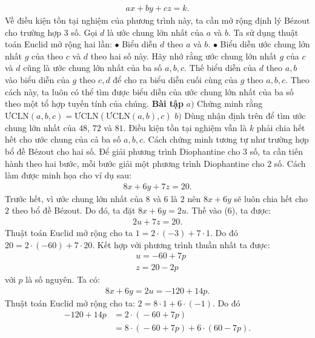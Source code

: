 \begin{multicols}{2}
	\begin{align*}
		ax+by+cz=k.
	\end{align*}
	Về điều kiện tồn tại nghiệm của phương trình này, ta cần mở rộng định lý Bézout cho trường hợp $3$ số.
	\vskip 0.1cm
	Gọi $d$ là ước chung lớn nhất của $a$ và $b$. Ta sử dụng thuật toán Euclid mở rộng hai lần: 
	\vskip 0.1cm
	$\bullet$ Biểu diễn $d$ theo $a$ và $b$.
	\vskip 0.1cm 
	$\bullet$ Biểu diễn ước chung lớn nhất $g$ của theo $c$ và $d$ theo hai số này. Hãy nhớ rằng ước chung lớn nhất $g$ của $c$ và $d$ cũng là ước chung lớn nhất của ba số $a,b,c$.
	\vskip 0.1cm
	Thế biểu diễn của $d$ theo $a,b$ vào biểu diễn của $g$ theo $c,d$ để cho ra biểu diễn cuối cùng của $g$ theo $a,b,c$.
	\vskip 0.1cm 
	Theo cách này, ta luôn có thể tìm được biểu diễn của ước chung lớn nhất của ba số theo một tổ hợp tuyến tính của chúng.
	\vskip 0.1cm
	\textbf{\color{hoccungpi}Bài tập}
	\vskip 0.1cm
	$a)$ Chứng minh rằng $\text{ƯCLN}(a,b,c) = \text{ƯCLN}(\text{ƯCLN}(a,b), c)$
	\vskip 0.1cm
	$b)$ Dùng nhận định trên để tìm ước chung lớn nhất của $48$, $72$ và $81$.
	\vskip 0.1cm
	Điều kiện tồn tại nghiệm vẫn là $k$ phải chia hết hết cho ước chung của cả ba số $a,b,c$. Cách chứng minh tương tự như trường hợp bổ đề Bézout cho hai số.
	\vskip 0.1cm
	Để giải phương trình Diophantine cho $3$ số, ta cần tiến hành theo hai bước, mỗi bước giải một phương trình Diophantine cho $2$ số. Cách làm được minh họa cho ví dụ sau:
	\begin{align*}
		8x+6y+7z=20. \tag{$6$}
	\end{align*}
	Trước hết, vì ước chung lớn nhất của $8$ và $6$ là $2$ nên $8x+6y$ sẽ luôn chia hết cho $2$ theo bổ đề Bézout. Do đó, ta đặt $8x+6y=2u$. Thế vào ($6$), ta được:
	\begin{align*}
		2u+7z=20.
	\end{align*}
	Thuật toán Euclid mở rộng cho ta $1=2\cdot (-3)+7\cdot 1$. Do đó $20=2\cdot (-60)+7\cdot 20$. Kết hợp với phương trình thuần nhất ta được:
	\begin{align*}
		&u=-60+7p\\
		&z=20-2p
	\end{align*}
	với $p$ là số nguyên.
	\vskip 0.1cm
	Ta có:
	\begin{align*}
		8x+6y=2u=-120+14p.
	\end{align*}
	Thuật toán Euclid mở rộng cho ta: $2=8\cdot 1+6\cdot (-1)$. Do đó 
	\begin{align*}
		-120+14p&=2\!\cdot\! (\!-\!60\!+\!7p)\\
		&=8\!\cdot\! (\!-\!60\!+\!7p)\!+\!6\!\cdot\! (60\!-\!7p).

\end{align*}
\end{multicols}
